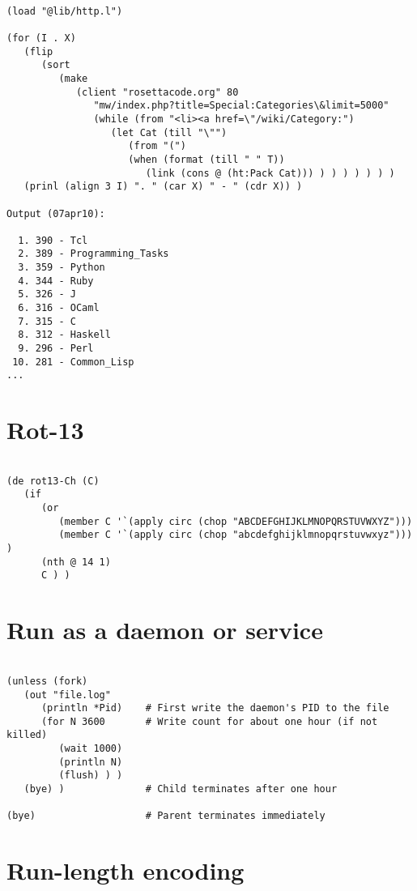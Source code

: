\begin{verbatim}

(load "@lib/http.l")

(for (I . X)
   (flip
      (sort
         (make
            (client "rosettacode.org" 80
               "mw/index.php?title=Special:Categories\&limit=5000"
               (while (from "<li><a href=\"/wiki/Category:")
                  (let Cat (till "\"")
                     (from "(")
                     (when (format (till " " T))
                        (link (cons @ (ht:Pack Cat))) ) ) ) ) ) ) )
   (prinl (align 3 I) ". " (car X) " - " (cdr X)) )

Output (07apr10):

  1. 390 - Tcl
  2. 389 - Programming_Tasks
  3. 359 - Python
  4. 344 - Ruby
  5. 326 - J
  6. 316 - OCaml
  7. 315 - C
  8. 312 - Haskell
  9. 296 - Perl
 10. 281 - Common_Lisp
...

\end{verbatim}

\section*{Rot-13}

\begin{verbatim}

(de rot13-Ch (C)
   (if
      (or
         (member C '`(apply circ (chop "ABCDEFGHIJKLMNOPQRSTUVWXYZ")))
         (member C '`(apply circ (chop "abcdefghijklmnopqrstuvwxyz"))) )
      (nth @ 14 1)
      C ) )

\end{verbatim}

\section*{Run as a daemon or service}

\begin{verbatim}

(unless (fork)
   (out "file.log"
      (println *Pid)    # First write the daemon's PID to the file
      (for N 3600       # Write count for about one hour (if not killed)
         (wait 1000)
         (println N)
         (flush) ) )
   (bye) )              # Child terminates after one hour

(bye)                   # Parent terminates immediately

\end{verbatim}

\section*{Run-length encoding}

